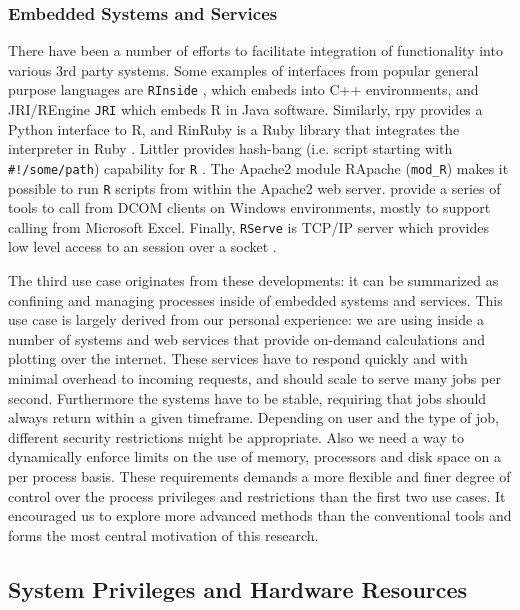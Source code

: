 \documentclass[article]{jss}
\begin{document}
\subsubsection{Embedded Systems and Services}

There have been a number of efforts to facilitate integration of 
functionality into various 3rd party systems. Some examples of interfaces from
popular general purpose languages are \texttt{RInside} \citep{RInside}, which
embeds  into C++ environments, and JRI/REngine \texttt{JRI} which
embeds R in Java software. Similarly, rpy \citep{moreira2006rpy} provides a
Python interface to R, and RinRuby is a Ruby library that integrates the
 interpreter in Ruby \citep{dahl2008rinruby}. Littler provides
hash-bang (i.e. script starting with \texttt{\#!/some/path}) capability for
\texttt{R} \citep{littler}. The Apache2 module RApache  (\texttt{mod\_R})
\citep{rapache} makes it possible to run \texttt{R} scripts from within the
Apache2 web server. \cite{heiberger2009r} provide a series of tools to call
 from DCOM clients on Windows environments, mostly to support
calling  from Microsoft Excel. Finally, \texttt{RServe} is TCP/IP
server which provides low level access to an  session over a socket
\citep{Rserve}.

The third use case originates from these developments: it can be summarized as
confining and managing  processes inside of embedded systems and
services. This use case is largely derived from our personal experience: we are
using  inside a number of systems and web services that provide
on-demand calculations and plotting over the internet. These services have to
respond quickly and with minimal overhead to incoming requests, and should
scale to serve many jobs per second. Furthermore the systems have to be stable,
requiring that jobs should always return within a given timeframe. Depending on
user and the type of job, different security restrictions might be appropriate.
Also we need a way to dynamically enforce limits on the use of memory,
processors and disk space on a per process basis. These requirements demands
a more flexible and finer degree of control over the process privileges and
restrictions than the first two use cases. It encouraged us to explore more
advanced methods than the conventional tools and forms the most central
motivation of this research.

\subsection{System Privileges and Hardware Resources}
 
\end{document}
